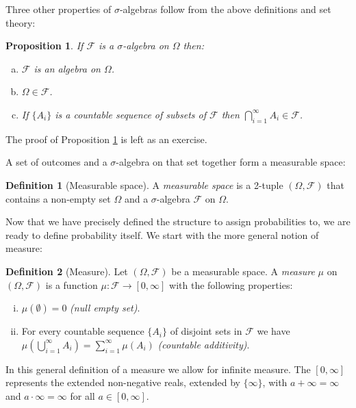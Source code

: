 \documentclass{book}
\theoremstyle{plain}%
\newtheorem{proposition}{Proposition}[section]
\theoremstyle{definition}
\newtheorem{definition}{Definition}[section]
\newlength{\arrow}
\begin{document}
Three other properties of $\sigma$-algebras follow from the above definitions and set theory:

\begin{proposition}
If $\mathcal{F}$ is a $\sigma$-algebra on $\Omega$ then:
\begin{enumerate}[(a)]
\item $\mathcal{F}$ is an algebra on $\Omega$.
\item  $\Omega \in \mathcal{F}$.
\item If $\{A_i\}$ is a countable sequence of subsets of $\mathcal{F}$ then $\bigcap_{i=1}^\infty A_i \in \mathcal{F}$.
\end{enumerate}\label{prop:001}
\end{proposition}

The proof of Proposition \ref{prop:001} is left as an exercise.

A set of outcomes and a $\sigma$-algebra on that set together form a measurable space:

\begin{definition}[Measurable space]
A \emph{measurable space} is a 2-tuple $(\Omega, \mathcal{F})$ that contains a non-empty set $\Omega$ and a $\sigma$-algebra $\mathcal{F}$ on $\Omega$.
\end{definition}

Now that we have precisely defined the structure to assign probabilities to, we are ready to define probability itself. We start with the more general notion of measure:

\begin{definition}[Measure]
Let $(\Omega, \mathcal{F})$  be a measurable space. A \emph{measure} $\mu$ on $(\Omega, \mathcal{F})$ is a function $\mu: \mathcal{F} \rightarrow [0, \infty]$ with the following properties:
\begin{enumerate}[(i)]
\item $\mu(\emptyset) = 0$ \emph{(null empty set)}.
\item For every countable sequence $\{A_i\}$ of disjoint sets in $\mathcal{F}$ we have $\mu(\bigcup_{i=1}^\infty A_i) = \sum_{i=1}^\infty \mu(A_i)$ \emph{(countable additivity)}.
\end{enumerate}
\end{definition}

In this general definition of a measure we allow for infinite measure. The $[0, \infty]$ represents the extended non-negative reals, extended by $\{\infty\}$, with $a + \infty = \infty$ and $a \cdot \infty = \infty$ for all $a \in [0, \infty]$.
\end{document}

